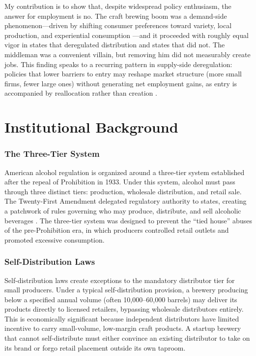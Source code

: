 \documentclass[12pt]{article}
\begin{document}
My contribution is to show that, despite widespread policy enthusiasm, the answer for employment is no. The craft brewing boom was a demand-side phenomenon---driven by shifting consumer preferences toward variety, local production, and experiential consumption \citep{murray2010craft, elzinga2015craft}---and it proceeded with roughly equal vigor in states that deregulated distribution and states that did not. The middleman was a convenient villain, but removing him did not measurably create jobs. This finding speaks to a recurring pattern in supply-side deregulation: policies that lower barriers to entry may reshape market structure (more small firms, fewer large ones) without generating net employment gains, as entry is accompanied by reallocation rather than creation \citep{davis2014role}.

\section{Institutional Background}

\subsubsection*{The Three-Tier System} American alcohol regulation is organized around a three-tier system established after the repeal of Prohibition in 1933. Under this system, alcohol must pass through three distinct tiers: production, wholesale distribution, and retail sale. The Twenty-First Amendment delegated regulatory authority to states, creating a patchwork of rules governing who may produce, distribute, and sell alcoholic beverages \citep{fogarty2010politics}. The three-tier system was designed to prevent the ``tied house'' abuses of the pre-Prohibition era, in which producers controlled retail outlets and promoted excessive consumption.

\subsubsection*{Self-Distribution Laws} Self-distribution laws create exceptions to the mandatory distributor tier for small producers. Under a typical self-distribution provision, a brewery producing below a specified annual volume (often 10,000--60,000 barrels) may deliver its products directly to licensed retailers, bypassing wholesale distributors entirely. This is economically significant because independent distributors have limited incentive to carry small-volume, low-margin craft products. A startup brewery that cannot self-distribute must either convince an existing distributor to take on its brand or forgo retail placement outside its own taproom.
\end{document}
